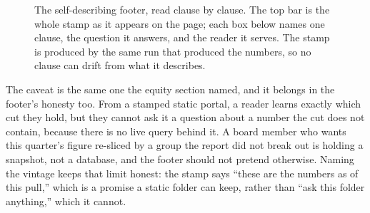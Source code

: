\documentclass[
    a4paper,
    fontsize=10pt,
    twoside=true,
    numbers=noenddot,
]{kaobook}
\begin{document}
\begin{figure}[htbp]
\centering
{}
\caption[Anatomy of a self-describing footer]{The self-describing footer, read clause by clause. The top bar is the whole stamp as it appears on the page; each box below names one clause, the question it answers, and the reader it serves. The stamp is produced by the same run that produced the numbers, so no clause can drift from what it describes.}
\label{fig:ch12-viz-footer}
\end{figure}

The caveat is the same one the equity section named, and it belongs in the footer's honesty too. From a stamped static portal, a reader learns exactly which cut they hold, but they cannot ask it a question about a number the cut does not contain, because there is no live query behind it. A board member who wants this quarter's figure re-sliced by a group the report did not break out is holding a snapshot, not a database, and the footer should not pretend otherwise. Naming the vintage keeps that limit honest: the stamp says \enquote{these are the numbers as of this pull,} which is a promise a static folder can keep, rather than \enquote{ask this folder anything,} which it cannot.
\end{document}
